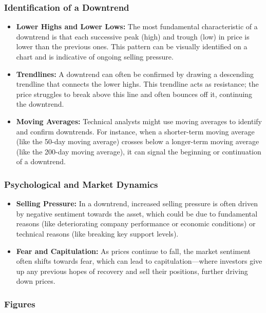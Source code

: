 \documentclass{report}
\begin{document}
    \subsubsection{Identification of a Downtrend}
    \bigbreak \noindent 
    \begin{itemize}
        \item \textbf{Lower Highs and Lower Lows:} The most fundamental characteristic of a downtrend is that each successive peak (high) and trough (low) in price is lower than the previous ones. This pattern can be visually identified on a chart and is indicative of ongoing selling pressure.
        \item \textbf{Trendlines:} A downtrend can often be confirmed by drawing a descending trendline that connects the lower highs. This trendline acts as resistance; the price struggles to break above this line and often bounces off it, continuing the downtrend.
        \item \textbf{Moving Averages:} Technical analysts might use moving averages to identify and confirm downtrends. For instance, when a shorter-term moving average (like the 50-day moving average) crosses below a longer-term moving average (like the 200-day moving average), it can signal the beginning or continuation of a downtrend.
    \end{itemize}
    \bigbreak \noindent 
    \subsubsection{Psychological and Market Dynamics}
    \begin{itemize}
        \item \textbf{Selling Pressure:} In a downtrend, increased selling pressure is often driven by negative sentiment towards the asset, which could be due to fundamental reasons (like deteriorating company performance or economic conditions) or technical reasons (like breaking key support levels).
        \item \textbf{Fear and Capitulation:} As prices continue to fall, the market sentiment often shifts towards fear, which can lead to capitulation—where investors give up any previous hopes of recovery and sell their positions, further driving down prices.
    \end{itemize}
    \pagebreak 
    \subsubsection{Figures}
    \bigbreak \noindent     
    \bigbreak \noindent 
\end{document}
